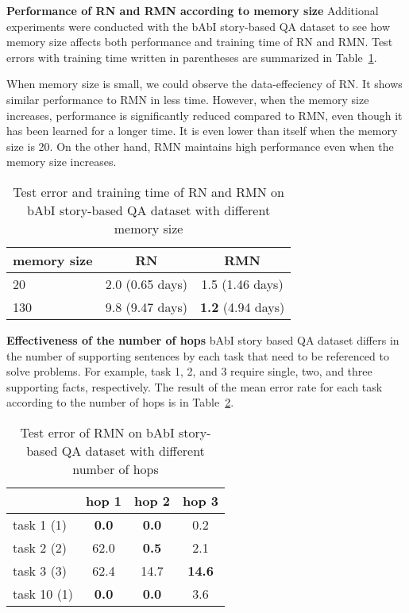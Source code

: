 \documentclass{article} \usepackage{iclr2018_conference,times}
\begin{document}
\textbf{Performance of RN and RMN according to memory size}\quad
Additional experiments were conducted with the bAbI story-based QA dataset to see how memory size affects both performance and training time of RN and RMN. 
Test errors with training time written in parentheses are summarized in Table~\ref{table:RN_RMN}.

When memory size is small, we could observe the data-effeciency of RN.
It shows similar performance to RMN in less time.
However, when the memory size increases, performance is significantly reduced compared to RMN, even though it has been learned for a longer time.
It is even lower than itself when the memory size is 20.
On the other hand, RMN maintains high performance even when the memory size increases.


\begin{table}[h]
\centering
\caption{Test error and training time of RN and RMN on bAbI story-based QA dataset with different memory size}
\label{table:RN_RMN}
\begin{adjustbox}{max width=0.95\textwidth}
\begin{tabular}{l|c|c}
\hline
memory size & RN              & RMN             \\ \hline
20          & 2.0 (0.65 days) &      1.5 (1.46 days)           \\ \hline
130         & 9.8 (9.47 days) & \textbf{1.2} (4.94 days) \\ \hline
\end{tabular}
\end{adjustbox}
\end{table}

\textbf{Effectiveness of the number of hops}\quad
bAbI story based QA dataset differs in the number of supporting sentences by each task that need to be referenced to solve problems.
For example, task 1, 2, and 3 require single, two, and three supporting facts, respectively.
The result of the mean error rate for each task according to the number of hops is in Table~\ref{table:task-wise_hop}.

\begin{table}[h]
\centering
\caption{Test error of RMN on bAbI story-based QA dataset with different number of hops}
\label{table:task-wise_hop}
\begin{adjustbox}{max width=0.95\textwidth}
\begin{tabular}{l|c|c|c} \hline
            & hop 1 & hop 2 & hop 3 \\ \hline
task 1 (1)~\footnotemark  & \textbf{0.0}   & \textbf{0.0}   & 0.2 \\ \hline
task 2 (2)  & 62.0 & \textbf{0.5} & 2.1 \\ \hline
task 3 (3)  & 62.4 & 14.7 & \textbf{14.6} \\ \hline
task 10 (1) & \textbf{0.0}   & \textbf{0.0}   & 3.6 \\ \hline
		\end{tabular}
\end{adjustbox}
\end{table}
\end{document}
